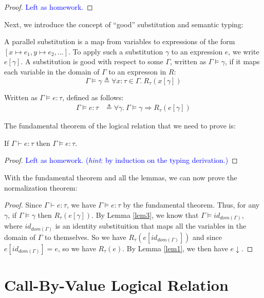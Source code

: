 \documentclass{notes}
\begin{document}
%
\begin{proof}
  \textcolor{blue}{Left as homework.}
\end{proof}
%
\noindent Next, we introduce the concept of ``good'' substitution and semantic typing:
%
\begin{defn}
  A parallel substitution is a map from variables to expressions of the form $[x \mapsto e_1, y \mapsto e_2, ...]$.
  To apply such a substitution $\gamma$ to an expression $e$, we write $e[\gamma]$.
  A substitution is good with respect to some $\Gamma$, written as $\Gamma \vDash \gamma$, if it maps each variable in the domain of $\Gamma$ to an expresson in $R$:
  \[ \Gamma \vDash \gamma \triangleq \forall x : \tau \in \Gamma.\: R_{\tau}(x[\gamma]) \]
\end{defn}
%
\begin{defn}
  Written as $\Gamma \vDash e : \tau$, defined as follows:
  \begin{align*}
    \Gamma \vDash e : \tau & \triangleq \forall \gamma.\: \Gamma \vDash \gamma \Longrightarrow R_{\tau}(e[\gamma])
  \end{align*}
\end{defn}
%
\noindent The fundamental theorem of the logical relation that we need to prove is:
%
\begin{thm}[Fundamental]
  If $\Gamma \vdash e : \tau$ then $\Gamma \vDash e : \tau$.
\end{thm}
%
\begin{proof}
  \textcolor{blue}{Left as homework. (\emph{hint}: by induction on the typing derivation.)}
\end{proof}
%
\noindent With the fundamental theorem and all the lemmas, we can now prove the normalization theorem:
%
\begin{proof}
  Since $\Gamma \vdash e : \tau$, we have $\Gamma \vDash e : \tau$ by the fundamental theorem.
  Thus, for any $\gamma$, if $\Gamma \vDash \gamma$ then $R_{\tau}(e[\gamma])$.
  By Lemma \ref{lem3}, we know that $\Gamma \vDash {id}_{{dom}(\Gamma)}$, where ${id}_{{dom(\Gamma)}}$ is an identity substituition that maps all the variables in the domain of $\Gamma$ to themselves.
  So we have $R_{\tau}(e[{id}_{{dom}(\Gamma)}])$ and since $e[{id}_{{dom}(\Gamma)}] = e$, so we have $R_{\tau}(e)$.
  By Lemma \ref{lem1}, we then have $e \downarrow$.
\end{proof}

\section{Call-By-Value Logical Relation}
\end{document}

